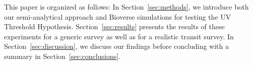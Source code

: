 \documentclass[twocolumn,twocolappendix,linenumbers]{aastex631}
\begin{document}
%

This paper is organized as follows:
In Section~\ref{sec:methods}, we introduce both our semi-analytical approach and Bioverse simulations for testing the UV Threshold Hypothesis.
Section~\ref{sec:results} presents the results of these experiments for a generic survey as well as for a realistic transit survey.
In Section~\ref{sec:discussion}, we discuss our findings before concluding with a summary in Section~\ref{sec:conclusions}.

%
\end{document}
